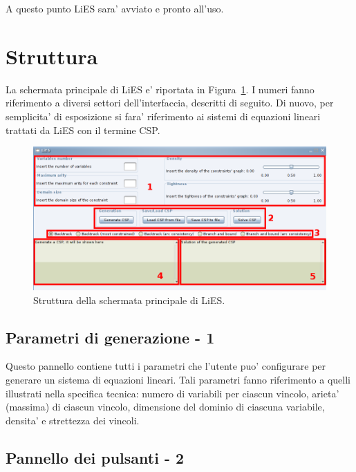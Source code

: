 \documentclass{article}
\begin{document}
A questo punto LiES sara' avviato e pronto all'uso.


\section{Struttura}
\label{sec:struttura}

La schermata principale di LiES e' riportata in Figura~\ref{fig:struttura}. I numeri fanno riferimento a diversi settori dell'interfaccia, descritti di seguito. Di nuovo, per semplicita' di esposizione si fara' riferimento ai sistemi di equazioni lineari trattati da LiES con il termine CSP.

\begin{figure}[htp!]
	\centering
	\includegraphics[scale=.4]{ug-images/structure.png}
	\caption{Struttura della schermata principale di LiES.}
	\label{fig:struttura}
\end{figure}

\subsection{Parametri di generazione - 1} 

Questo pannello contiene tutti i parametri che l'utente puo' configurare per generare un sistema di equazioni lineari. Tali parametri fanno riferimento a quelli illustrati nella specifica tecnica: numero di variabili per ciascun vincolo, arieta' (massima) di ciascun vincolo, dimensione del dominio di ciascuna variabile, densita' e strettezza dei vincoli.

\subsection{Pannello dei pulsanti - 2}
\end{document}
